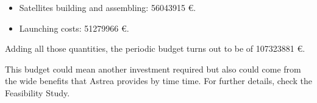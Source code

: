 \begin{itemize}
\item Satellites building and assembling: 56043915 \euro .
\item Launching costs: 51279966 \euro .
\end{itemize}

Adding all those quantities, the periodic budget turns out to be of 107323881 \euro. 

This budget could mean another investment required but also could come from the wide benefits that Astrea provides by time time. For further details, check the Feasibility Study.



